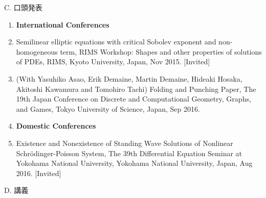 \documentclass[a4j,twocolumn]{jarticle}
\begin{document}
\vspace{0.2cm}
\noindent
C. 口頭発表

\vspace{0.1cm}

\begin{enumerate}
 \item[] {\bf International Conferences}
 \item Semilinear elliptic equations with critical Sobolev exponent and
       non-homogeneous term, RIMS Workshop: Shapes and other properties
       of solutions of PDEs, RIMS, Kyoto University, Japan, Nov 2015.
       [Invited]
 \item (With Yasuhiko Asao, Erik Demaine, Martin Demaine, Hideaki
       Hosaka, Akitoshi Kawamura and Tomohiro Tachi)
       Folding and Punching Paper, The 19th Japan Conference on Discrete
       and Computational Geometry, Graphs, and Games, Tokyo University
       of Science, Japan, Sep 2016.
 \item[] {\bf Domestic Conferences}
 \item Existence and Nonexistence of Standing Wave Solutions of
       Nonlinear Schr\"{o}dinger-Poisson System,
       The 39th Differential Equation Seminar at Yokohama National
       University, Yokohama National University, Japan, Aug 2016.
       [Invited]
\end{enumerate}

\vspace{0.2cm}
\noindent
D. 講義

\vspace{0.1cm}
\end{document}
